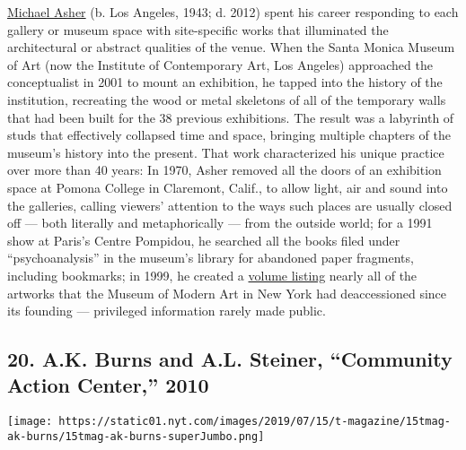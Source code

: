 \href{https://www.nytimes.com/2012/10/18/arts/design/michael-asher-artist-dies-at-69.html}{Michael
Asher} (b. Los Angeles, 1943; d. 2012) spent his career responding to
each gallery or museum space with site-specific works that illuminated
the architectural or abstract qualities of the venue. When the Santa
Monica Museum of Art (now the Institute of Contemporary Art, Los
Angeles) approached the conceptualist in 2001 to mount an exhibition, he
tapped into the history of the institution, recreating the wood or metal
skeletons of all of the temporary walls that had been built for the 38
previous exhibitions. The result was a labyrinth of studs that
effectively collapsed time and space, bringing multiple chapters of the
museum's history into the present. That work characterized his unique
practice over more than 40 years: In 1970, Asher removed all the doors
of an exhibition space at Pomona College in Claremont, Calif., to allow
light, air and sound into the galleries, calling viewers' attention to
the ways such places are usually closed off --- both literally and
metaphorically --- from the outside world; for a 1991 show at Paris's
Centre Pompidou, he searched all the books filed under
``psychoanalysis'' in the museum's library for abandoned paper
fragments, including bookmarks; in 1999, he created a
\href{http://moma.org/d/c/exhibition_catalogues/W1siZiIsIjMwMDA5OTYwMiJdLFsicCIsImVuY292ZXIiLCJ3d3cubW9tYS5vcmcvY2FsZW5kYXIvZXhoaWJpdGlvbnMvMTg1IiwiaHR0cDovL21vbWEub3JnL2NhbGVuZGFyL2V4aGliaXRpb25zLzE4NT9sb2NhbGU9cHQiLCJpIl1d.pdf?sha=9748391a05a89941}{volume
listing} nearly all of the artworks that the Museum of Modern Art in New
York had deaccessioned since its founding --- privileged information
rarely made public.

\hypertarget{20-ak-burns-and-al-steiner-community-action-center-2010}{%
\subsection{20. A.K. Burns and A.L. Steiner, ``Community Action
Center,''
2010}\label{20-ak-burns-and-al-steiner-community-action-center-2010}}

\texttt{[image: https://static01.nyt.com/images/2019/07/15/t-magazine/15tmag-ak-burns/15tmag-ak-burns-superJumbo.png]}


